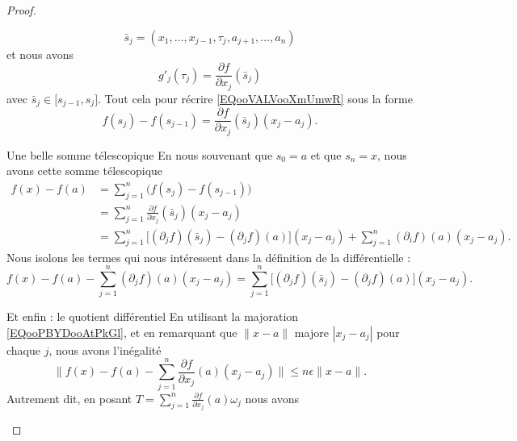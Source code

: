 \begin{proof}
\begin{subproof}
            \begin{equation}
                \bar s_j=(x_1,\ldots, x_{j-1},\tau_j,a_{j+1},\ldots, a_n)
            \end{equation}
            et nous avons
            \begin{equation}
                g'_j(\tau_j)=\frac{ \partial f }{ \partial x_j }(\bar s_j)
            \end{equation}
            avec \( \bar s_j\in\mathopen[ s_{j-1} , s_j \mathclose]\). Tout cela pour récrire \eqref{EQooVALVooXmUmwR} sous la forme
            \begin{equation}
                f(s_j)-f(s_{j-1})=\frac{ \partial f }{ \partial x_j }(\bar s_j)(x_j-a_j).
            \end{equation}
        \item[Une belle somme télescopique]
            En nous souvenant que \( s_0=a\) et que \( s_n=x\), nous avons cette somme télescopique
            \begin{subequations}
                \begin{align}
                    f(x)-f(a)&=\sum_{j=1}^n\big( f(s_j)-f(s_{j-1}) \big)\\
                    &=\sum_{j=1}^n\frac{ \partial f }{ \partial x_j }(\bar s_j)(x_j-a_j)\\
                    &=\sum_{j=1}^n\big[ (\partial_jf)(\bar s_j)-(\partial_jf)(a) \big](x_j-a_j)+\sum_{j=1}^n(\partial_if)(a)(x_j-a_j).
                \end{align}
            \end{subequations}
            Nous isolons les termes qui nous intéressent dans la définition de la différentielle :
            \begin{equation}
                f(x)-f(a)-\sum_{j=1}^n(\partial_jf)(a)(x_j-a_j)=\sum_{j=1}^n\big[ (\partial_jf)(\bar s_j)-(\partial_jf)(a) \big](x_j-a_j).
            \end{equation}
        \item[Et enfin : le quotient différentiel]
            En utilisant la majoration \eqref{EQooPBYDooAtPkGl}, et en remarquant que \( \| x-a \|\) majore \( | x_j-a_j |\) pour chaque \( j\), nous avons l'inégalité
            \begin{equation}
                \| f(x)-f(a)-\sum_{j=1}^n\frac{ \partial f }{ \partial x_j }(a)(x_j-a_j) \|\leq n\epsilon\| x-a \|.
            \end{equation}
            Autrement dit, en posant \( T=\sum_{j=1}^n\frac{ \partial f }{ \partial x_j }(a)\omega_j\) nous avons

\end{subproof}
\end{proof}
